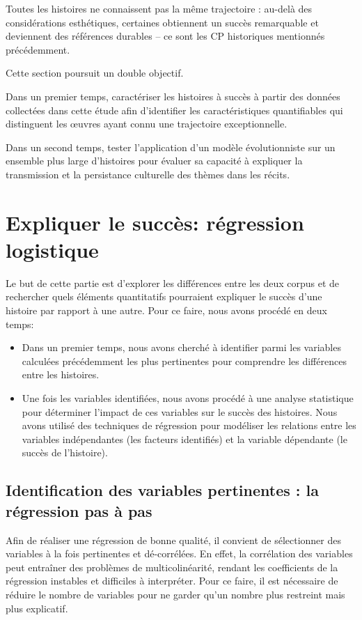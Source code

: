 \documentclass[12pt,a4paper,oneside,titlepage]{book} %
\begin{document}
Toutes les histoires ne connaissent pas la même trajectoire : au-delà des considérations esthétiques, certaines obtiennent un succès remarquable et deviennent des références durables – ce sont les CP historiques mentionnés précédemment. 

Cette section poursuit un double objectif.

Dans un premier temps, caractériser les histoires à succès à partir des données collectées dans cette étude afin d'identifier les caractéristiques quantifiables qui distinguent les œuvres ayant connu une trajectoire exceptionnelle.

Dans un second temps, tester l'application d'un modèle évolutionniste sur un ensemble plus large d'histoires pour évaluer sa capacité à expliquer la transmission et la persistance culturelle des thèmes dans les récits. 

\section{Expliquer le succès: régression logistique}

Le but de cette partie est d'explorer les différences entre les deux corpus et de rechercher quels éléments quantitatifs pourraient expliquer le succès d'une histoire par rapport à une autre. Pour ce faire, nous avons procédé en deux temps:
\begin{itemize}
\item  Dans un premier temps, nous avons cherché à identifier parmi les variables calculées précédemment les plus pertinentes pour comprendre les différences entre les histoires. 

\item  Une fois les variables identifiées, nous avons procédé à une analyse statistique pour déterminer l'impact de ces variables sur le succès des histoires. Nous avons utilisé des techniques de régression pour modéliser les relations entre les variables indépendantes (les facteurs identifiés) et la variable dépendante (le succès de l'histoire). 
\end{itemize}

\subsection{Identification des variables pertinentes : la régression pas à pas }

Afin de réaliser une régression de bonne qualité, il convient de sélectionner des variables à la fois pertinentes et dé-corrélées. En effet, la corrélation des variables peut entraîner des problèmes de multicolinéarité, rendant les coefficients de la régression instables et difficiles à interpréter. Pour ce faire, il est nécessaire de réduire le nombre de variables pour ne garder qu'un nombre plus restreint mais plus explicatif. 
\end{document}
